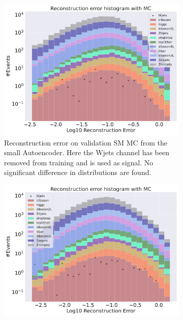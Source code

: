 \begin{figure}[h!]
    \centering
    \begin{subfigure}{.45\textwidth}
        \includegraphics[width=\textwidth]{Figures/VAE_testing/small/b_data_recon_big_rm3_feats_sig_Wjets.pdf}
        \caption{Reconstruction error on validation SM MC from the small Autoencoder. Here the Wjets channel has been removed from training and 
        is used as signal. No significant difference in distributions are found.}
        \label{fig:vae_small_Wjets}
    \end{subfigure}
    \hfill 
    \begin{subfigure}{.45\textwidth}
        \includegraphics[width=\textwidth]{Figures/VAE_testing/big/b_data_recon_big_rm3_feats_sig_Wjets.pdf}

\end{subfigure}
\end{figure}
